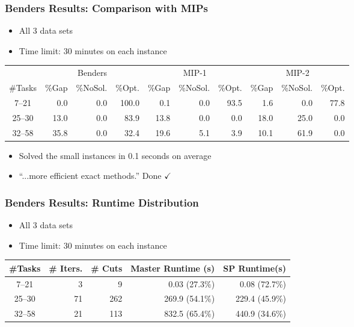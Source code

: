 \documentclass{beamer}
\begin{document}
\begin{frame}
\frametitle{Benders Results: Comparison with MIPs}
\begin{itemize}
	\item All 3 data sets\vspace{1mm}
	\item Time limit: 30 minutes on each instance
\end{itemize}
\begin{table}
	\setlength{\tabcolsep}{0.2em}
	\centering
	\small
	\begin{tabular}{crrrrrrrrr}
		\toprule
		& \multicolumn{3}{c}{Benders} & \multicolumn{3}{c}{MIP-1} & \multicolumn{3}{c}{MIP-2}  \\
		 \cmidrule(lr){2-4} \cmidrule(lr){5-7} \cmidrule(lr){8-10}
		\#Tasks & \%Gap &\%NoSol. &  \%Opt. & \%Gap & \%NoSol. & \%Opt. & \%Gap & \%NoSol. & \%Opt. \\\midrule\midrule
		7--21 & 0.0 & 0.0 & {\color{red} 100.0} & 0.1 & 0.0 & {\color{red} 93.5} & 1.6 & 0.0 & {\color{red} 77.8} \\
		25--30 & 13.0 & 0.0 & {\color{red} 83.9} & 13.8 & 0.0 & {\color{red} 0.0} & 18.0 & 25.0 & {\color{red} 0.0} \\
		32--58 & 35.8 & 0.0 & {\color{red} 32.4} & 19.6 & 5.1 & {\color{red} 3.9} & 10.1 & 61.9 & {\color{red} 0.0} \\
		\bottomrule
	\end{tabular}
\end{table}\pause
\begin{itemize}
	\item Solved the small instances in 0.1 seconds on average
	\item ``...more efficient exact methods.'' \pause Done $\checkmark$
\end{itemize}
\end{frame}

\begin{frame}
\frametitle{Benders Results: Runtime Distribution}
\begin{itemize}
	\item All 3 data sets\vspace{1mm}
	\item Time limit: 30 minutes on each instance
\end{itemize}
\begin{table}
	\centering
	\begin{tabular}{crrrr}
		\toprule
		\#Tasks & \# Iters. & \# Cuts & Master Runtime (s) & SP Runtime(s) \\\midrule\midrule
		7--21 & 3 & 9 & 0.03 (27.3\%) & 0.08 (72.7\%) \\
		25--30 & 71 & 262 & 269.9 (54.1\%) & 229.4 (45.9\%) \\
		32--58 & 21 & 113 & 832.5 (65.4\%) & 440.9 (34.6\%) \\
		\bottomrule
	\end{tabular}
\end{table}
\end{frame}
\end{document}
